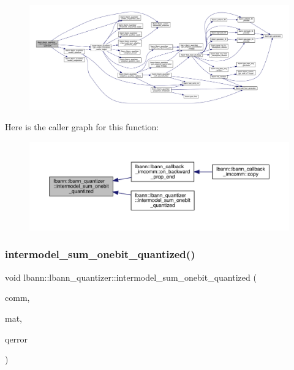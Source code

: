 \begin{figure}[H]
\begin{center}
\leavevmode
\includegraphics[width=350pt]{classlbann_1_1lbann__quantizer_a4b326de1ca5b7eba6415b6f42f83335b_cgraph}
\end{center}
\end{figure}
Here is the caller graph for this function\+:\nopagebreak
\begin{figure}[H]
\begin{center}
\leavevmode
\includegraphics[width=350pt]{classlbann_1_1lbann__quantizer_a4b326de1ca5b7eba6415b6f42f83335b_icgraph}
\end{center}
\end{figure}
\mbox{\label{classlbann_1_1lbann__quantizer_af24e00e26e157f102f3cef547de40ae1}} 
\subsubsection{\texorpdfstring{intermodel\+\_\+sum\+\_\+onebit\+\_\+quantized()}{intermodel\_sum\_onebit\_quantized()}\hspace{0.1cm}{\footnotesize\ttfamily [2/2]}}
{\footnotesize\ttfamily void lbann\+::lbann\+\_\+quantizer\+::intermodel\+\_\+sum\+\_\+onebit\+\_\+quantized (\begin{DoxyParamCaption}\item[{\hyperlink{classlbann_1_1lbann__comm}{lbann\+\_\+comm} $\ast$}]{comm,  }\item[{\hyperlink{base_8hpp_a0fab5387556805cfeac3e7e567bf66c5}{Dist\+Mat} \&}]{mat,  }\item[{\hyperlink{base_8hpp_a68f11fdc31b62516cb310831bbe54d73}{Mat} \&}]{qerror }\end{DoxyParamCaption})}



